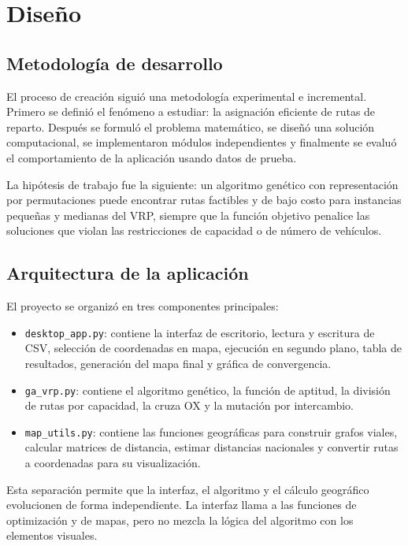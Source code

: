 \documentclass[runningheads]{llncs}
\begin{document}
\section{Diseño}

\subsection{Metodología de desarrollo}

El proceso de creación siguió una metodología experimental e incremental. Primero se definió el fenómeno a estudiar: la asignación eficiente de rutas de reparto. Después se formuló el problema matemático, se diseñó una solución computacional, se implementaron módulos independientes y finalmente se evaluó el comportamiento de la aplicación usando datos de prueba.

La hipótesis de trabajo fue la siguiente: un algoritmo genético con representación por permutaciones puede encontrar rutas factibles y de bajo costo para instancias pequeñas y medianas del VRP, siempre que la función objetivo penalice las soluciones que violan las restricciones de capacidad o de número de vehículos.

\subsection{Arquitectura de la aplicación}

El proyecto se organizó en tres componentes principales:

\begin{itemize}
    \item \texttt{desktop\_app.py}: contiene la interfaz de escritorio, lectura y escritura de CSV, selección de coordenadas en mapa, ejecución en segundo plano, tabla de resultados, generación del mapa final y gráfica de convergencia.
    \item \texttt{ga\_vrp.py}: contiene el algoritmo genético, la función de aptitud, la división de rutas por capacidad, la cruza OX y la mutación por intercambio.
    \item \texttt{map\_utils.py}: contiene las funciones geográficas para construir grafos viales, calcular matrices de distancia, estimar distancias nacionales y convertir rutas a coordenadas para su visualización.
\end{itemize}

Esta separación permite que la interfaz, el algoritmo y el cálculo geográfico evolucionen de forma independiente. La interfaz llama a las funciones de optimización y de mapas, pero no mezcla la lógica del algoritmo con los elementos visuales.
\end{document}
